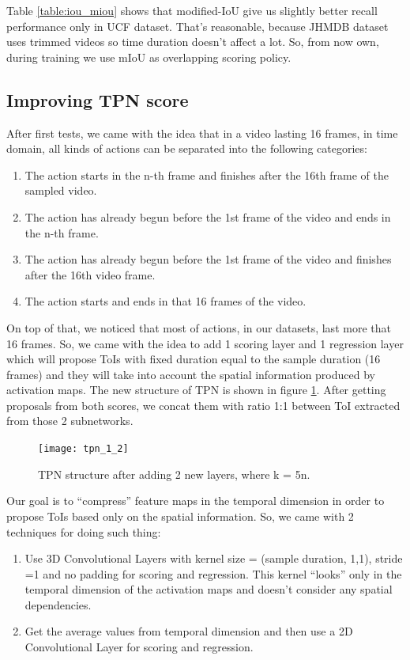 Table \ref{table:iou_miou} shows that modified-IoU give us slightly better recall performance only in UCF dataset. That's reasonable, because JHMDB dataset
uses trimmed videos so time duration doesn't affect a lot. So, from now own, during training we use mIoU as overlapping scoring policy.

\subsection{Improving TPN score}
After first tests, we came with the idea that in a video lasting 16 frames, in time domain, all kinds of actions can be separated into the following categories:
\begin{enumerate}
\item The action starts in the n-th  frame and finishes after the 16th frame of the sampled video.
\item The action has already begun before the 1st frame of the video and ends in the n-th frame.
\item The action has already begun before the 1st frame of the video and finishes after the 16th video frame.
\item The action starts and ends in that 16 frames of the video.
\end{enumerate}

On top of that, we noticed that most of actions, in our datasets, last more that 16 frames. So, we came with the idea to add  1 scoring layer and 1 regression layer
which will propose ToIs with fixed duration equal to the sample duration (16 frames) and they will take into account the spatial information produced by activation maps.
The new structure of TPN is shown in figure \ref{fig:tpn_1_2}. After getting proposals from both scores, we concat them with ratio 1:1 between ToI extracted
from those 2 subnetworks.

\begin{figure}[h]
  \centering
  \texttt{[image: tpn\_1\_2]}
  \caption{TPN structure after adding 2 new layers, where k = 5n.}
  \label{fig:tpn_1_2}
\end{figure}
Our goal is to ``compress'' feature maps in the temporal dimension in order to propose ToIs based only on the spatial information.
So, we came with 2 techniques for doing such thing:
\begin{enumerate}
\item Use 3D Convolutional Layers with kernel size = (sample duration, 1,1), stride =1 and no padding for scoring and regression.
  This kernel ``looks'' only in the temporal dimension of the activation maps and doesn't consider any spatial dependencies.
\item Get the average values from temporal dimension and then use a 2D Convolutional Layer for scoring and regression.
\end{enumerate}

